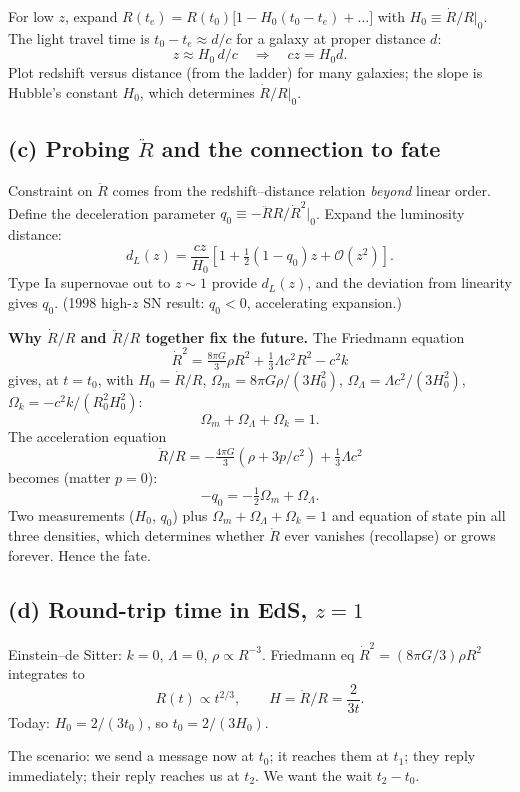 \documentclass[11pt]{article}
\begin{document}
For low $z$, expand $R(t_e) = R(t_0)\bigl[1 - H_0(t_0 - t_e) + \dots\bigr]$ with $H_0 \equiv \dot R/R|_0$. The light travel time is $t_0-t_e \approx d/c$ for a galaxy at proper distance $d$:
\[
z \approx H_0\,d/c \quad\Longrightarrow\quad cz = H_0 d.
\]
Plot redshift versus distance (from the ladder) for many galaxies; the slope is Hubble's constant $H_0$, which determines $\dot R/R|_0$.

\subsection*{(c) Probing $\ddot R$ and the connection to fate}

Constraint on $\ddot R$ comes from the redshift--distance relation \emph{beyond} linear order. Define the deceleration parameter $q_0 \equiv -\ddot R R/\dot R^2|_0$. Expand the luminosity distance:
\[
d_L(z) = \frac{cz}{H_0}\left[1 + \tfrac12(1 - q_0)z + \mathcal{O}(z^2)\right].
\]
Type Ia supernovae out to $z\sim 1$ provide $d_L(z)$, and the deviation from linearity gives $q_0$. (1998 high-$z$ SN result: $q_0<0$, accelerating expansion.)

\textbf{Why $\dot R/R$ and $\ddot R/R$ together fix the future.} The Friedmann equation
\[
\dot R^2 = \tfrac{8\pi G}{3}\rho R^2 + \tfrac13\Lambda c^2 R^2 - c^2 k
\]
gives, at $t=t_0$, with $H_0 = \dot R/R$, $\Omega_m = 8\pi G\rho/(3 H_0^2)$, $\Omega_\Lambda = \Lambda c^2/(3 H_0^2)$, $\Omega_k = -c^2 k/(R_0^2 H_0^2)$:
\[
\Omega_m + \Omega_\Lambda + \Omega_k = 1.
\]
The acceleration equation
\[
\ddot R/R = -\tfrac{4\pi G}{3}(\rho + 3p/c^2) + \tfrac13\Lambda c^2
\]
becomes (matter $p=0$):
\[
-q_0 = -\tfrac12\Omega_m + \Omega_\Lambda.
\]
Two measurements ($H_0$, $q_0$) plus $\Omega_m+\Omega_\Lambda+\Omega_k=1$ and equation of state pin all three densities, which determines whether $\dot R$ ever vanishes (recollapse) or grows forever. Hence the fate.

\subsection*{(d) Round-trip time in EdS, $z=1$}

Einstein--de Sitter: $k=0$, $\Lambda=0$, $\rho\propto R^{-3}$. Friedmann eq $\dot R^2 = (8\pi G/3)\rho R^2$ integrates to
\[
R(t) \propto t^{2/3},\qquad H = \dot R/R = \frac{2}{3 t}.
\]
Today: $H_0 = 2/(3 t_0)$, so $t_0 = 2/(3 H_0)$.

The scenario: we send a message now at $t_0$; it reaches them at $t_1$; they reply immediately; their reply reaches us at $t_2$. We want the wait $t_2 - t_0$.
\end{document}
